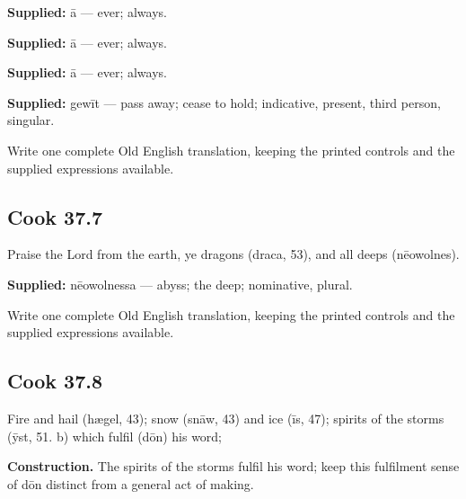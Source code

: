 \textbf{Supplied:} ā — ever; always.

\textbf{Supplied:} ā — ever; always.

\textbf{Supplied:} ā — ever; always.

\textbf{Supplied:} gewīt — pass away; cease to hold; indicative, present, third person, singular.

Write one complete Old English translation, keeping the printed controls and the supplied expressions available.

\par\begin{minipage}{\linewidth}\raggedright
\subsection*{Cook 37.7}

Praise the Lord from the earth, ye dragons (draca, 53), and all deeps (nēowolnes).

\textbf{Supplied:} nēowolnessa — abyss; the deep; nominative, plural.

Write one complete Old English translation, keeping the printed controls and the supplied expressions available.

\end{minipage}\par\addvspace{4pt}

\par\begin{minipage}{\linewidth}\raggedright
\subsection*{Cook 37.8}

Fire and hail (hægel, 43); snow (snāw, 43) and ice (īs, 47); spirits of the storms (ȳst, 51. b) which fulfil (dōn) his word;

\textbf{Construction.} The spirits of the storms fulfil his word; keep this fulfilment sense of dōn distinct from a general act of making.

\end{minipage}\par\addvspace{4pt}

